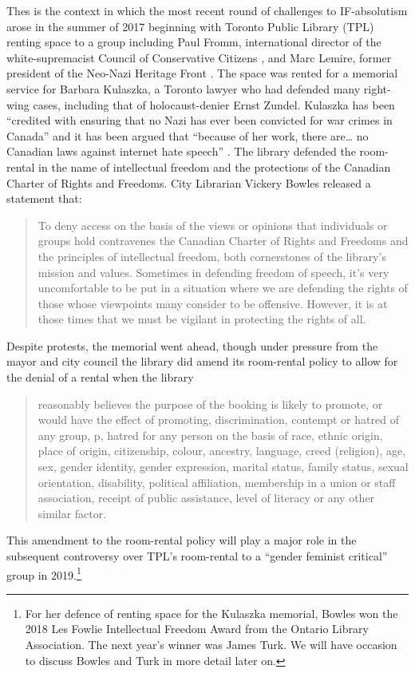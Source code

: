 \documentclass[12pt,oneside]{memoir}
\begin{document}
Thes is the context in which the most recent round of challenges to IF-absolutism arose in the summer of 2017 beginning with Toronto Public Library (TPL) renting space to a group including  Paul Fromm, international director of the white-supremacist Council of Conservative Citizens \cite{quan-2015}, and Marc Lemire, former president of the Neo-Nazi Heritage Front \cite{craggs-2019}. The space was rented for a memorial service for Barbara Kulaszka, a Toronto lawyer who had defended many right-wing cases, including that of holocaust-denier Ernst Zundel.  Kulaszka has been ``credited with ensuring that no Nazi has ever been convicted for war crimes in Canada'' and it has been argued that ``because of her work, there are{\ldots} no Canadian laws against internet hate speech'' \cite{shakeri-2017}. The library defended the room-rental in the name of intellectual freedom and the protections of the Canadian Charter of Rights and Freedoms. City Librarian Vickery Bowles released a statement that: 
\begin{quote}
To deny access on the basis of the views or opinions that individuals or groups hold contravenes the Canadian Charter of Rights and Freedoms and the principles of intellectual freedom, both cornerstones of the library's mission and values. Sometimes in defending freedom of speech, it's very uncomfortable to be put in a situation where we are defending the rights of those whose viewpoints many consider to be offensive. However, it is at those times that we must be vigilant in protecting the rights of all. \cite{tpl-kulaszka}
\end{quote}
 Despite protests, the memorial went ahead, though under pressure from the mayor and city council the library did amend its room-rental policy to allow for the denial of a rental when the library 
\begin{quote}
reasonably believes the purpose of the booking is likely to promote, or would have the effect of promoting, discrimination, contempt or hatred of any group, p, hatred for any person on the basis of race, ethnic origin, place of origin, citizenship, colour, ancestry, language, creed (religion), age, sex, gender identity, gender expression, marital status, family status, sexual orientation, disability, political affiliation, membership in a union or staff association, receipt of public assistance, level of literacy or any other similar factor. \cite{tpl-revisions}
\end{quote}
This amendment to the room-rental policy will play a major role in the subsequent controversy over TPL's room-rental to a ``gender feminist critical'' group in 2019.\footnote{For her defence of renting space for the Kulaszka memorial, Bowles won the 2018 Les Fowlie Intellectual Freedom Award from the Ontario Library Association. The next year's winner was James Turk. We will have occasion to discuss Bowles and Turk in more detail later on.} 
\end{document}
